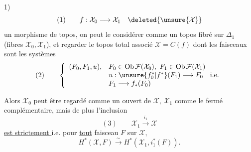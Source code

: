 
1) 
\[
(1)\qquad f:\mathcal X_0\longrightarrow\mathcal X_1\quad\deleted{\unsure{\mathcal X}}
\]
un morphisme de topos, on peut le considérer comme un topos fibré sur $\Delta_1$ (fibres $\mathcal X_0,\mathcal X_1$), et regarder le topos total associé $\mathcal X=C(f)$  dont les faisceaux sont les systèmes
\[
(2)\qquad\left\{\begin{array}{ll}
(F_0,F_1,u),&F_0\in\operatorname{Ob}\mathcal F(\mathcal X_0),\ F_1\in\operatorname{Ob}\mathcal F(\mathcal X_1)\\
&u:\unsure{f_0^*|f^*}(F_1)\longrightarrow F_0\quad\text{i.e.}\\
&F_1\longrightarrow f_*(F_0)
\end{array}\right.
\]

Alors $\mathcal X_0$ peut être regardé comme un ouvert de $\mathcal X$, $\mathcal X_1$ comme le fermé complémentaire, mais de plus l'inclusion
\[
(3)\qquad\mathcal X_1\xrightarrow{i_1}\mathcal X
\]
\uline{est strictement }
i.e. pour \uline{tout} faisceau $F$  sur $\mathcal X$,
\[
H^*(\mathcal X,F)\xrightarrow{\sim}H^*(\mathcal X_1,i_1^*(F)).
\]

